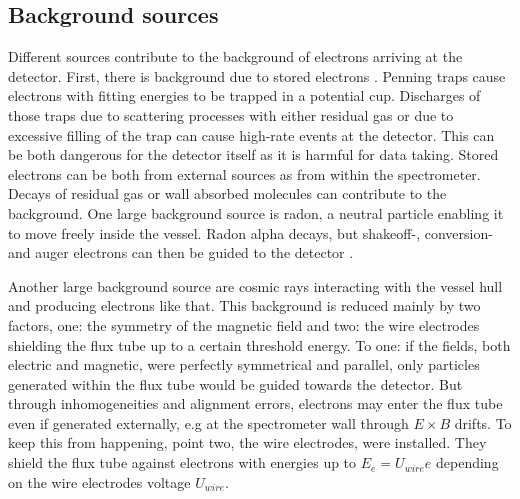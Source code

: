       \subsection{Background sources}
      \label{ch:The KATRIN experiment:sec:Experimental setup:subsec:BackgroundSources}
      Different sources contribute to the background of electrons arriving at the detector. First, there is background due to stored electrons \cite{storedElectrons}. Penning traps cause electrons with fitting energies to be trapped in a potential cup. Discharges of those traps due to scattering processes with either residual gas or due to excessive filling of the trap can cause high-rate events at the detector. This can be both dangerous for the detector itself as it is harmful for data taking. Stored electrons can be both from external sources as from within the spectrometer. Decays of residual gas or wall absorbed molecules can contribute to the background. One large background source is radon, a neutral particle enabling it to move freely inside the vessel. Radon alpha decays, but shakeoff-, conversion- and auger electrons can then be guided to the detector \cite{radonGoerhard}.
      
      Another large background source are cosmic rays interacting with the vessel hull and producing electrons like that. This background is reduced mainly by two factors, one: the symmetry of the magnetic field and two: the wire electrodes shielding the flux tube up to a certain threshold energy.
      To one: if the fields, both electric and magnetic, were perfectly symmetrical and parallel, only particles generated within the flux tube would be guided towards the detector. But through inhomogeneities and alignment errors, electrons may enter the flux tube even if generated externally, e.g at the spectrometer wall through $E\times B$ drifts. To keep this from happening, point two, the wire electrodes, were installed. They shield the flux tube against electrons with energies up to $E_e = U_{wire}e$ depending on the wire electrodes voltage $U_{wire}$. 